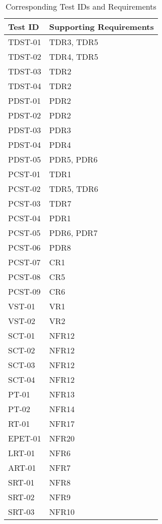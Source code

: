 \documentclass[12pt, titlepage]{article}
\begin{document}
\begin{longtable}{ |p{4cm}|p{8cm}|  }
  \caption{Corresponding Test IDs and Requirements}
  \label{tab:Table1}\\
  
  \hline
  \textbf{Test ID} & \textbf{Supporting Requirements}\\
  \hline
  TDST-01 &  TDR3, TDR5\\
  \hline
  TDST-02 &  TDR4, TDR5 \\
  \hline
  TDST-03 &  TDR2 \\
  \hline
  TDST-04 &  TDR2 \\
  \hline
  PDST-01 &  PDR2 \\
  \hline
  PDST-02 &  PDR2 \\
  \hline
  PDST-03 &  PDR3 \\
  \hline
  PDST-04 &  PDR4 \\
  \hline
  PDST-05 &  PDR5, PDR6 \\
  \hline
  PCST-01 &  TDR1 \\
  \hline
  PCST-02 &  TDR5, TDR6 \\
  \hline
  PCST-03 &  TDR7 \\
  \hline
  PCST-04 &  PDR1 \\
  \hline
  PCST-05 &  PDR6, PDR7 \\
  \hline
  PCST-06 &  PDR8 \\
  \hline
  PCST-07 &  CR1 \\
  \hline
  PCST-08 &  CR5 \\
  \hline
  PCST-09 &  CR6 \\
  \hline
  VST-01 &  VR1 \\
  \hline
  VST-02&  VR2 \\
  \hline
  SCT-01 &  NFR12 \\
  \hline
  SCT-02 &  NFR12 \\
  \hline
  SCT-03 &  NFR12 \\
  \hline
  SCT-04 &  NFR12 \\
  \hline
  PT-01 & NFR13 \\
  \hline
  PT-02 & NFR14 \\
  \hline
  RT-01 & NFR17 \\
  \hline
  EPET-01 & NFR20 \\
  \hline
  LRT-01&  NFR6 \\
  \hline
  ART-01 & NFR7 \\
  \hline
  SRT-01 & NFR8 \\
  \hline
  SRT-02 & NFR9 \\
  \hline
  SRT-03 & NFR10 \\
  \hline
\end{longtable}
\end{document}

